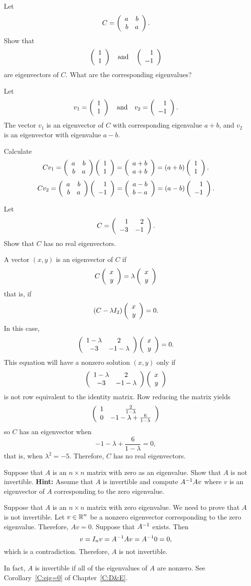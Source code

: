 \documentclass{ximera}
\begin{document}
\begin{exercise} \label{c4.5.3}
Let
\[
C=\left(\begin{array}{rr} a & b\\ b &a\end{array}\right).
\]
Show that
\[
\left(\begin{array}{r} 1 \\ 1\end{array}\right) \quad\mbox{and}\quad \left(\begin{array}{r} 1 \\ -1\end{array}\right)
\]
are eigenvectors of $C$.  What are the corresponding eigenvalues?

\begin{solution}

\ans Let
\[ v_1 = \left(\begin{array}{r} 1 \\ 1\end{array}\right) \quad\mbox{and}\quad v_2 = \left(\begin{array}{r} 1 \\ -1\end{array}\right). \]
The vector $v_1$ is an eigenvector of $C$ with corresponding
eigenvalue $a + b$, and $v_2$ is an eigenvector with eigenvalue $a - b$.

\soln Calculate
\[ Cv_1 = \left(\begin{array}{rr} a & b\\ b &a\end{array}\right)\left(\begin{array}{r} 1 \\ 1\end{array}\right) = \left(\begin{array}{r} a + b \\ a + b\end{array}\right) =
(a + b)\left(\begin{array}{r} 1 \\ 1\end{array}\right). \]
\[ Cv_2 = \left(\begin{array}{rr} a & b\\ b &a\end{array}\right)\left(\begin{array}{r} 1 \\ -1\end{array}\right) = \left(\begin{array}{r} a - b \\ b - a\end{array}\right) =
(a - b)\left(\begin{array}{r} 1 \\ -1\end{array}\right). \]


\end{solution}
\end{exercise}

\begin{exercise} \label{c4.5.4}
Let
\[
C=\left(\begin{array}{rr} 1 & 2\\ -3 &-1\end{array}\right).
\]
Show that $C$ has no real eigenvectors.

\begin{solution}

A vector $(x,y)$ is an eigenvector of $C$ if
\[ C\left(\begin{array}{r} x \\ y\end{array}\right) = \lambda\left(\begin{array}{r} x \\ y\end{array}\right) \]
that is, if
\[ (C - \lambda I_2)\left(\begin{array}{r} x \\ y\end{array}\right) = 0. \]
In this case,
\[ \left(\begin{array}{cc} 1 - \lambda & 2\\ -3 &-1 - \lambda\end{array}\right)
\left(\begin{array}{r} x \\ y\end{array}\right) = 0. \]
This equation will have a nonzero solution $(x,y)$ only if
\[ \left(\begin{array}{cc} 1 - \lambda & 2\\ -3 &-1 - \lambda\end{array}\right)\left(\begin{array}{r} x \\ y\end{array}\right) \]
is not row equivalent to the identity matrix.
Row reducing the matrix yields
\[ \left(\begin{array}{cc} 1 & \frac{2}{1 - \lambda}\\ 0 &-1 - \lambda + \frac{6}{1-\lambda}\end{array}\right) \]
so $C$ has an eigenvector when
\[ -1 - \lambda + \frac{6}{1-\lambda} = 0, \]
that is, when $\lambda^2 = -5$.  Therefore, $C$ has no real 
eigenvectors.

\end{solution}
\end{exercise}

\begin{exercise}  \label{c4.9.6A}
Suppose that $A$ is an $n\times n$ matrix with zero as an eigenvalue.
Show that $A$ is not invertible.  {\bf Hint:}  Assume that $A$ is invertible 
and compute $A^{-1} Av$ where $v$ is an eigenvector of $A$ corresponding to 
the zero eigenvalue.

\begin{solution}

Suppose that $A$ is an $n\times n$ matrix with zero eigenvalue.  We need to
prove that $A$ is not invertible.  Let $v\in\mbox{$\Bbb{R}$}^n$ be a nonzero 
eigenvector corresponding to the zero eigenvalue.  Therefore, $Av=0$. 
Suppose that $A^{-1}$ exists.  Then
\[
v = I_nv = A^{-1} Av = A^{-1} 0 = 0,
\]
which is a contradiction.  Therefore, $A$ is not invertible.

\end{solution}
\end{exercise}
  In fact, $A$ is invertible if 
all of the eigenvalues of $A$ are nonzero.  See Corollary~\ref{C:eig=0} of 
Chapter~\ref{C:D&E}.
\end{document}
